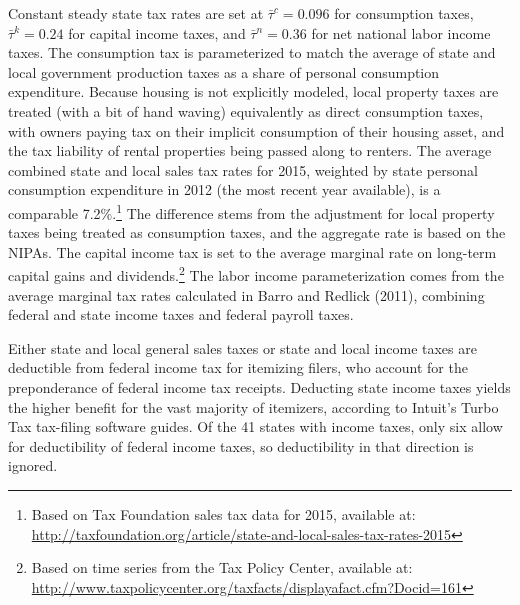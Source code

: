 \documentclass[12pt,letterpaper]{article}
\begin{document}
Constant steady state tax rates are set at $\bar{\tau}^c = 0.096$ for consumption taxes, $\bar{\tau}^k = 0.24$ for capital income taxes, and $\bar{\tau}^n = 0.36$ for net national labor income taxes. The consumption tax is parameterized to match the average of state and local government production taxes as a share of personal consumption expenditure. Because housing is not explicitly modeled, local property taxes are treated (with a bit of hand waving) equivalently as direct consumption taxes, with owners paying tax on their implicit consumption of their housing asset, and the tax liability of rental properties being passed along to renters. The average combined state and local sales tax rates for 2015, weighted by state personal consumption expenditure in 2012 (the most recent year available), is a comparable 7.2\%.\footnote{Based on Tax Foundation sales tax data for 2015, available at: \url{http://taxfoundation.org/article/state-and-local-sales-tax-rates-2015}} The difference stems from the adjustment for local property taxes being treated as consumption taxes, and the aggregate rate is based on the NIPAs. The capital income tax is set to the average marginal rate on long-term capital gains and dividends.\footnote{Based on time series from the Tax Policy Center, available at: \url{http://www.taxpolicycenter.org/taxfacts/displayafact.cfm?Docid=161}} The labor income parameterization comes from the average marginal tax rates calculated in Barro and Redlick (2011), combining federal and state income taxes and federal payroll taxes. 

Either state and local general sales taxes or state and local income taxes are deductible from federal income tax for itemizing filers, who account for the preponderance of federal income tax receipts. Deducting state income taxes yields the higher benefit for the vast majority of itemizers, according to Intuit's Turbo Tax tax-filing software guides. Of the 41 states with income taxes, only six allow for deductibility of federal income taxes, so deductibility in that direction is ignored.



\newpage
\end{document}
